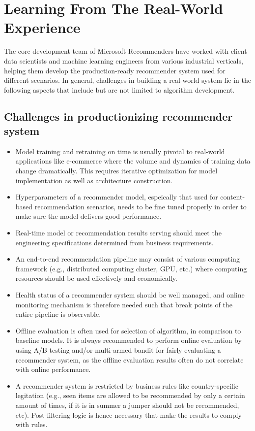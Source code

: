 \section{Learning From The Real-World Experience} %
The core development team of Microsoft Recommenders have worked with client data scientists and machine learning engineers from various industrial verticals, helping them develop the production-ready recommender system used for different scenarios. In general, challenges in building a real-world system lie in the following aspects that include but are not limited to algorithm development.

\subsection{Challenges in productionizing recommender system}

\begin{itemize}
    \item Model training and retraining on time is usually pivotal to real-world applications like e-commerce where the volume and dynamics of training data change dramatically. This requires iterative optimization for model implementation as well as architecture construction.
    \item Hyperparameters of a recommender model, espeically that used for content-based recommendation scenarios, needs to be fine tuned properly in order to make sure the model delivers good performance. 
    \item Real-time model or recommendation results serving should meet the engineering specifications determined from business requirements. 
    \item An end-to-end recommendation pipeline may consist of various computing framework (e.g., distributed computing cluster, GPU, etc.) where computing resources should be used effectively and economically. 
    \item Health status of a recommender system should be well managed, and online monitoring mechanism is therefore needed such that break points of the entire pipeline is observable.
    \item Offline evaluation is often used for selection of algorithm, in comparison to baseline models. It is always recommended to perform online evaluation by using A/B testing and/or multi-armed bandit for fairly evaluating a recommender system, as the offline evaluation results often do not correlate with online performance.
    \item A recommender system is restricted by business rules like country-specific legitation (e.g., seen items are allowed to be recommended by only a certain amount of times, if it is in summer a jumper should not be recommended, etc). Post-filtering logic is hence necessary that make the results to comply with rules.
\end{itemize}

